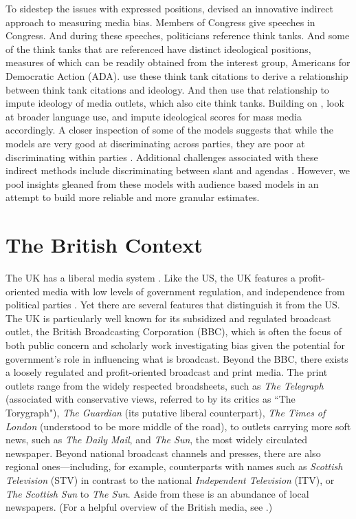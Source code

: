 \documentclass[12pt, letterpaper]{article}
\begin{document}
To sidestep the issues with expressed positions, \citet{groseclose2005} devised an innovative indirect approach to measuring media bias. Members of Congress give speeches in Congress. And during these speeches, politicians reference think tanks. And some of the think tanks that are referenced have distinct ideological positions, measures of which can be readily obtained from the interest group, Americans for Democratic Action (ADA). \citet{groseclose2005} use these think tank citations to derive a relationship between think tank citations and ideology. And then use that relationship to impute ideology of media outlets, which also cite think tanks. Building on \citet{groseclose2005}, \citet{gentzkow2010} look at broader language use, and impute ideological scores for mass media accordingly. A closer inspection of some of the models suggests that while the models are very good at discriminating across parties, they are poor at discriminating within parties \citep{barbera2016, gentzkow2015measuring}. Additional challenges associated with these indirect methods include discriminating between slant and agendas \citep[see, for e.g.,][]{quinn2010}. However, we pool insights gleaned from these models with audience based models in an attempt to build more reliable and more granular estimates.

\section*{The British Context}

The UK has a liberal media system \citep{hallin2011comparing}. Like the US, the UK features a profit-oriented media with low levels of government regulation, and independence from political parties \citep{hallin2004}. Yet there are several features that distinguish it from the US. The UK is particularly well known for its subsidized and regulated broadcast outlet, the British Broadcasting Corporation (BBC), which is often the focus of both public concern and scholarly work investigating bias given the potential for government's role in influencing what is broadcast. Beyond the BBC, there exists a loosely regulated and profit-oriented broadcast and print media. The print outlets range from the widely respected broadsheets, such as \textit{The Telegraph} (associated with conservative views, referred to by its critics as ``The Torygraph"), \textit{The Guardian} (its putative liberal counterpart), \textit{The Times of London} (understood to be more middle of the road), to outlets carrying more soft news, such as \textit{The Daily Mail}, and \textit{The Sun}, the most widely circulated newspaper. Beyond national broadcast channels and presses, there are also regional ones---including, for example, counterparts with names such as \textit{Scottish Television} (STV) in contrast to the national \textit{Independent Television} (ITV), or \textit{The Scottish Sun} to \textit{The Sun}. Aside from these is an abundance of local newspapers. (For a helpful overview of the British media, see \citet{eldridge1997}.)
\end{document}
